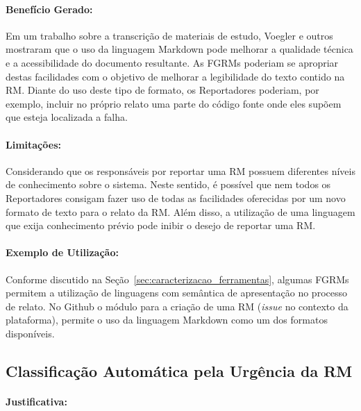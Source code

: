 \paragraph{Benefício Gerado:}
\label{par:papéis_afetados_s06}

Em um trabalho sobre a transcrição de materiais de estudo, Voegler e
outros~\cite{voegler2014markdown} mostraram que o uso da linguagem Markdown pode
melhorar a qualidade técnica e a acessibilidade do documento resultante. As
FGRMs poderiam se apropriar destas facilidades com o objetivo de melhorar a
legibilidade do texto contido na RM\@. Diante do uso deste tipo de formato, os
Reportadores poderiam, por exemplo, incluir no próprio relato uma parte do
código fonte onde eles supõem que esteja localizada a falha.

\paragraph{Limitações:}
\label{par:limitacoes_s06}

Considerando que os responsáveis por reportar uma RM possuem diferentes níveis
de conhecimento sobre o sistema. Neste sentido, é possível que nem todos os
Reportadores consigam fazer uso de todas as facilidades oferecidas por um novo
formato de texto para o relato da RM\@. Além disso, a utilização de uma
linguagem que exija conhecimento prévio pode inibir o desejo de reportar uma
RM\@.

\paragraph{Exemplo de Utilização:}
\label{par:exemplo_de_utilização_s06}

Conforme discutido na Seção~\ref{sec:caracterizacao_ferramentas}, algumas FGRMs
permitem a utilização de linguagens com semântica de apresentação no processo de
relato. No Github o módulo para a criação de uma RM (\textit{issue} no contexto
da plataforma), permite o uso da linguagem Markdown como um dos formatos
disponíveis.

\subsection{Classificação Automática pela Urgência da RM}
\label{sub:priorizacao_automatica_rms}


\paragraph{Justificativa:}
\label{par:justificativa_s07}

